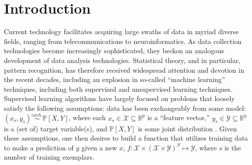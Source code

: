\documentclass[10pt,journal,cspaper,compsoc]{IEEEtran}
\providecommand{\mc}[1]{\mathcal{#1}}
\newcommand{\Real}{\mathbb{R}}
\newcommand{\PP}{\mathbb{P}}
\begin{document}
\maketitle


\IEEEdisplaynotcompsoctitleabstractindextext


%
\IEEEpeerreviewmaketitle

\section{Introduction} %
\label{sec:introduction}

Current technology facilitates acquiring large swaths of data in myriad diverse fields, ranging from telecommunications to neuroinformatics. As  data collection technologies become increasingly sophisticated,  they beckon an analogous development of data analysis technologies.  Statistical theory, and in particular, pattern recognition, has therefore received widespread attention and devotion in the recent decades, including an explosion in so-called ``machine learning'' techniques, including both supervised and unsupervised learning techniques.  Supervised learning algorithms have largely focused on problems that loosely satisfy the following assumptions: data has been exchangeably from some model: $(x_s,y_s) \overset{exch.}{\sim} \PP[X,Y]$, where each $x_s \in \mc{X} \subseteq \Real^p$ is a ``feature vector,'' $y_s \in \mc{Y} \subseteq\Real^q$ is a (set of) target variable(s), and $\PP[X,Y]$ is some joint distribution \cite{DGL96}.  Given these assumptions, one then desires to build a function that utilizes training data to make a prediction of $y$ given a new $x$, $f: \mc{X} \times (\mc{X} \times \mc{Y})^S \mapsto \mc{Y}$, where $s$ is the number of training exemplars.  
\end{document}
